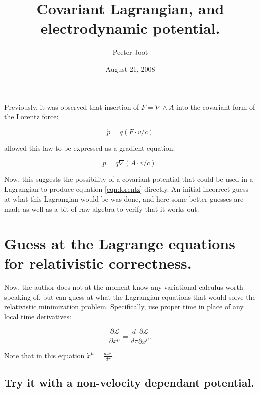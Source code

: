 \documentclass{article}
\title{ Covariant Lagrangian, and electrodynamic potential. }
\author{Peeter Joot}
\date{August 21, 2008}
\newcommand{\grad}[0] {\nabla}
\begin{document}
\maketitle{}

\section{}

Previously, it was observed that insertion of $F = \grad \wedge A$ into
the covariant form of the Lorentz force:

\begin{equation}\label{eqn:lorentz}
\dot{p} = q (F \cdot v/c)
\end{equation}

allowed this law to be expressed as a gradient equation:

\begin{equation}
\dot{p} = q \grad (A \cdot v/c).
\end{equation}

Now, this suggests the possibility of a covariant potential that could be 
used in a Lagrangian to produce equation \ref{eqn:lorentz} directly.  An
initial incorrect guess at what this Lagrangian would be was done, and
here some better guesses are made as well as a bit of raw algebra to verify
that it works out.

\section{ Guess at the Lagrange equations for relativistic correctness. }

Now, the author does not at the moment know any variational calculus worth
speaking of, but can guess at what the Lagrangian equations that would 
solve the relativistic minimization problem.  Specifically, use proper
time in place of any local time derivatives:

\begin{equation}\label{eqn:properLagrange}
\frac{\partial \mathcal{L}}{\partial x^{\mu}} = 
\frac{d}{d\tau} \frac{\partial \mathcal{L}}{\partial \dot{x}^{\mu}}.
\end{equation}

Note that in this equation $\dot{x}^{\mu} = \frac{d x^{\mu}}{d\tau}$.

\subsection{ Try it with a non-velocity dependant potential. }
\end{document}
